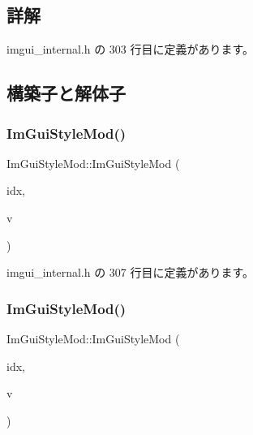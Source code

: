 \subsection{詳解}


 imgui\+\_\+internal.\+h の 303 行目に定義があります。



\subsection{構築子と解体子}
\mbox{\label{struct_im_gui_style_mod_ae9987273b247f021020034256364bec8}} 
\subsubsection{\texorpdfstring{Im\+Gui\+Style\+Mod()}{ImGuiStyleMod()}\hspace{0.1cm}{\footnotesize\ttfamily [1/3]}}
{\footnotesize\ttfamily Im\+Gui\+Style\+Mod\+::\+Im\+Gui\+Style\+Mod (\begin{DoxyParamCaption}\item[{\mbox{\hyperlink{imgui_8h_ac919acabce24faae590e295b424874ca}{Im\+Gui\+Style\+Var}}}]{idx,  }\item[{int}]{v }\end{DoxyParamCaption})\hspace{0.3cm}{\ttfamily [inline]}}



 imgui\+\_\+internal.\+h の 307 行目に定義があります。

\mbox{\label{struct_im_gui_style_mod_a737c3fad802a8d5d4616f9decc7e402d}} 
\subsubsection{\texorpdfstring{Im\+Gui\+Style\+Mod()}{ImGuiStyleMod()}\hspace{0.1cm}{\footnotesize\ttfamily [2/3]}}
{\footnotesize\ttfamily Im\+Gui\+Style\+Mod\+::\+Im\+Gui\+Style\+Mod (\begin{DoxyParamCaption}\item[{\mbox{\hyperlink{imgui_8h_ac919acabce24faae590e295b424874ca}{Im\+Gui\+Style\+Var}}}]{idx,  }\item[{float}]{v }\end{DoxyParamCaption})\hspace{0.3cm}{\ttfamily [inline]}}



